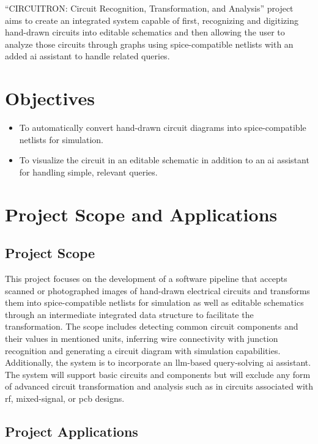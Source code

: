 ``CIRCUITRON: Circuit Recognition, Transformation, and Analysis'' project aims to create an integrated system capable of first, recognizing and digitizing hand-drawn circuits into editable schematics and then allowing the user to analyze those circuits through graphs using \gls{spice}-compatible netlists with an added \gls{ai} assistant to handle related queries.

\section{Objectives}

\begin{itemize}
    \item To automatically convert hand-drawn circuit diagrams into \gls{spice}-compatible netlists for simulation.
    \item To visualize the circuit in an editable schematic in addition to an \gls{ai} assistant for handling simple, relevant queries.
\end{itemize}

\section{Project Scope and Applications}

\subsection{Project Scope}

This project focuses on the development of a software pipeline that accepts scanned or photographed images of hand-drawn electrical circuits and transforms them into \gls{spice}-compatible netlists for simulation as well as editable schematics through an intermediate integrated data structure to facilitate the transformation. The scope includes detecting common circuit components and their values in mentioned units, inferring wire connectivity with junction recognition and generating a circuit diagram with simulation capabilities. Additionally, the system is to incorporate an \gls{llm}-based query-solving \gls{ai} assistant. The system will support basic circuits and components but will exclude any form of advanced circuit transformation and analysis such as in circuits associated with \gls{rf}, mixed-signal, or \gls{pcb} designs.

\subsection{Project Applications}


